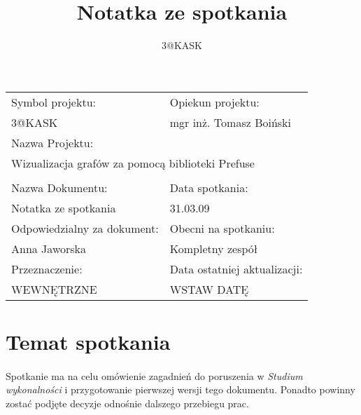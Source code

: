 \documentclass[a4paper,10pt]{article}
\title{Notatka ze spotkania}
\author{3@KASK}
\begin{document}



\maketitle


\begin{center}
\begin{tabular}{|p{7cm}|p{7cm}|}
\hline
Symbol projektu: & Opiekun projektu:   \tabularnewline 
3@KASK & mgr inż. Tomasz Boiński    \tabularnewline \hline
\multicolumn{2}{|l|}{Nazwa Projektu: } \tabularnewline
\multicolumn{2}{|l|}{Wizualizacja grafów za pomocą biblioteki Prefuse } \tabularnewline 
\hline
\multicolumn{2}{l}{ } \tabularnewline %
\hline 
Nazwa Dokumentu: & Data spotkania:   \tabularnewline 
Notatka ze spotkania & 31.03.09 \tabularnewline \hline
Odpowiedzialny za dokument: & Obecni na spotkaniu:   \tabularnewline 
Anna Jaworska & Kompletny zespół \tabularnewline \hline
Przeznaczenie: & Data ostatniej aktualizacji:   \tabularnewline 
WEWNĘTRZNE & WSTAW DATĘ \tabularnewline \hline
\end{tabular}
\end{center}


\section{Temat spotkania}
\paragraph{}Spotkanie ma na celu omówienie zagadnień do poruszenia w \textit{Studium wykonalności} i przygotowanie pierwszej wersji tego dokumentu. Ponadto powinny zostać podjęte decyzje odnośnie dalszego przebiegu prac. 
\end{document}
